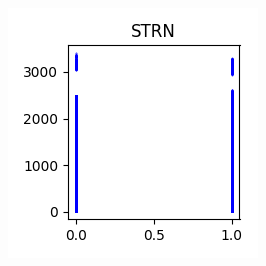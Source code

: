 \documentclass[sigconf,authorversion]{acmart}
\begin{document}
\begin{figure}[hbtp]
\begin{subfigure}[b]{0.3\textwidth}
        \label{fig:strm}
    \end{subfigure}
    \begin{subfigure}[b]{0.3\textwidth}
        \includegraphics[width=\textwidth]{img/STRN.png}
        \label{fig:strn}
    \end{subfigure}
\end{figure}
\end{document}
